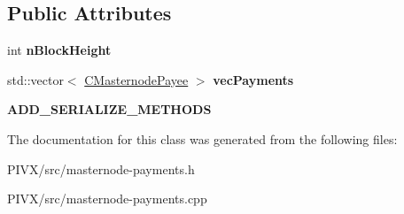 \subsection*{Public Attributes}
\begin{DoxyCompactItemize}
\item 
\mbox{\label{class_c_masternode_block_payees_ae7eae4dd466c444d7c41debcbcc402f1}} 
int {\bfseries n\+Block\+Height}
\item 
\mbox{\label{class_c_masternode_block_payees_a8b68374c052c9f4508732943ccd4c17c}} 
std\+::vector$<$ \mbox{\hyperlink{class_c_masternode_payee}{C\+Masternode\+Payee}} $>$ {\bfseries vec\+Payments}
\item 
\mbox{\label{class_c_masternode_block_payees_ab596470ea981333cb3a905422c64eec1}} 
{\bfseries A\+D\+D\+\_\+\+S\+E\+R\+I\+A\+L\+I\+Z\+E\+\_\+\+M\+E\+T\+H\+O\+DS}
\end{DoxyCompactItemize}


The documentation for this class was generated from the following files\+:\begin{DoxyCompactItemize}
\item 
P\+I\+V\+X/src/masternode-\/payments.\+h\item 
P\+I\+V\+X/src/masternode-\/payments.\+cpp\end{DoxyCompactItemize}
